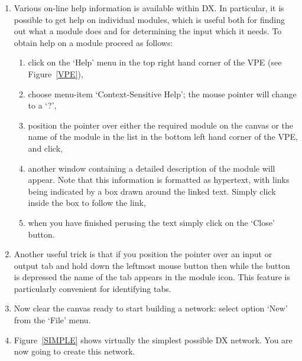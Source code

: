 \documentclass[twoside,11pt]{starlink}
\begin{document}
\begin{enumerate}
  \item Various on-line help information is available within DX. In
   particular, it is possible to get help on individual modules, which
   is useful both for finding out what a module does and for determining
   the input which it needs. To obtain help on a module proceed as
   follows:

  \begin{enumerate}

    \item click on the `Help' menu in the top right hand corner of
     the VPE (see Figure~\ref{VPE}),

    \item choose menu-item `Context-Sensitive Help'; the mouse pointer
     will change to a `?',

    \item position the pointer over either the required module on the
     canvas or the name of the module in the list in the bottom left
     hand corner of the VPE, and click,

    \item another window containing a detailed description of the module
     will appear. Note that this information is formatted as hypertext,
     with links being indicated by a box drawn around the linked text.
     Simply click inside the box to follow the link,

    \item when you have finished perusing the text simply click on the
     `Close' button.

  \end{enumerate}

  \item Another useful trick is that if you position the pointer over
   an input or output tab and hold down the leftmost mouse button then
   while the button is depressed the name of the tab appears in the
   module icon. This feature is particularly convenient for identifying
   tabs.

  \item Now clear the canvas ready to start building a network: select
   option `New' from the `File' menu.

  \item Figure~\ref{SIMPLE} shows virtually the simplest possible DX
   network. You are now going to create this network.

  \begin{figure}[htbp]


\end{figure}
\end{enumerate}
\end{document}
